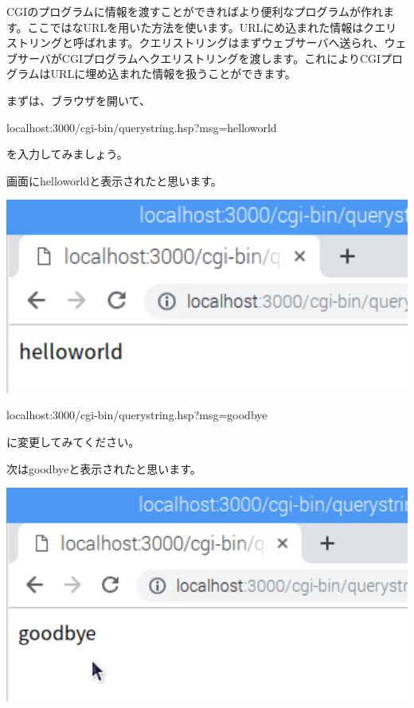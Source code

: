 \documentclass[a4paper,12pt,dvipdfmx]{jarticle}
\begin{document}
CGIのプログラムに情報を渡すことができればより便利なプログラムが作れます。ここではなURLを用いた方法を使います。URLにめ込まれた情報はクエリストリングと呼ばれます。クエリストリングはまずウェブサーバへ送られ、ウェブサーバがCGIプログラムへクエリストリングを渡します。これによりCGIプログラムはURLに埋め込まれた情報を扱うことができます。


\bigskip

まずは、ブラウザを開いて、

localhost:3000/cgi-bin/querystring.hsp?msg=helloworld

を入力してみましょう。

%


画面にhelloworldと表示されたと思います。



\centering
\includegraphics[width=15.528cm]{ome7-img053.png}
\flushleft

localhost:3000/cgi-bin/querystring.hsp?msg=goodbye

に変更してみてください。

%


次はgoodbyeと表示されたと思います。

\centering
\includegraphics[width=15.494cm]{ome7-img054.png}
\flushleft
\end{document}
